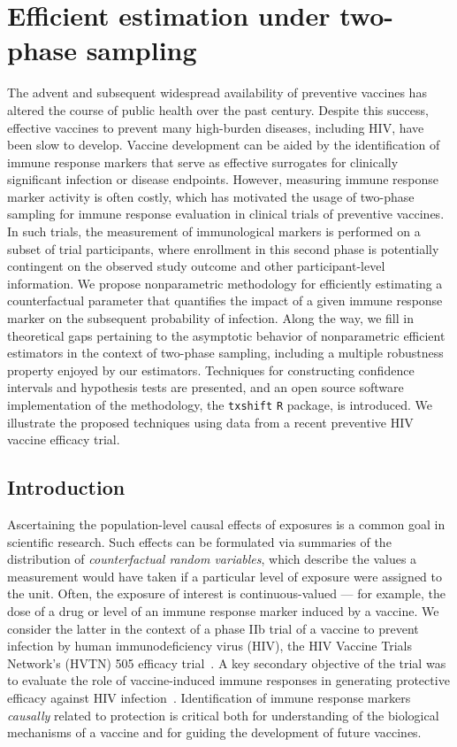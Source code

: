\chapter{Efficient estimation under two-phase sampling}

The advent and subsequent widespread availability of preventive vaccines has
altered the course of public health over the past century. Despite this success,
effective vaccines to prevent many high-burden diseases, including HIV, have
been slow to develop. Vaccine development can be aided by the identification of
immune response markers that serve as effective surrogates for clinically
significant infection or disease endpoints. However, measuring immune response
marker activity is often costly, which has motivated the usage of two-phase
sampling for immune response evaluation in clinical trials of preventive
vaccines. In such trials, the measurement of immunological markers is performed
on a subset of trial participants, where enrollment in this second phase is
potentially contingent on the observed study outcome and other participant-level
information. We propose nonparametric methodology for efficiently estimating
a counterfactual parameter that quantifies the impact of a given immune response
marker on the subsequent probability of infection. Along the way, we fill in
theoretical gaps pertaining to the asymptotic behavior of nonparametric
efficient estimators in the context of two-phase sampling, including a multiple
robustness property enjoyed by our estimators. Techniques for constructing
confidence intervals and hypothesis tests are presented, and an open source
software implementation of the methodology, the \texttt{txshift} \texttt{R}
package, is introduced. We illustrate the proposed techniques using data from
a recent preventive HIV vaccine efficacy trial.

\section{Introduction}\label{intro}

Ascertaining the population-level causal effects of exposures is a common goal
in scientific research. Such effects can be formulated via summaries of the
distribution of \emph{counterfactual random variables}, which describe the
values a measurement would have taken if a particular level of exposure were
assigned to the unit. Often, the exposure of interest is continuous-valued ---
for example, the dose of a drug or level of an immune response marker induced by
a vaccine. We consider the latter in the context of a phase IIb trial of
a vaccine to prevent infection by human immunodeficiency virus (HIV), the HIV
Vaccine Trials Network's (HVTN) 505 efficacy trial~\citep{hammer2013efficacy}.
A key secondary objective of the trial was to evaluate the role of
vaccine-induced immune responses in generating protective efficacy against HIV
infection~\citep{janes2017higher}. Identification of immune response markers
\textit{causally} related to protection is critical both for understanding of
the biological mechanisms of a vaccine and for guiding the development of future
vaccines.

